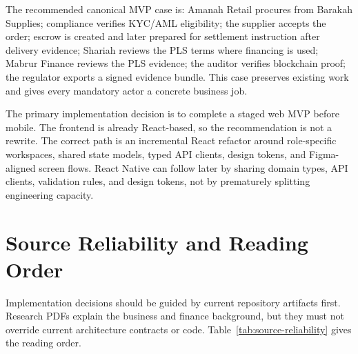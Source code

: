 \documentclass[conference]{IEEEtran}
\begin{document}
The recommended canonical MVP case is: Amanah Retail procures from Barakah Supplies; compliance verifies KYC/AML eligibility; the supplier accepts the order; escrow is created and later prepared for settlement instruction after delivery evidence; Shariah reviews the PLS terms where financing is used; Mabrur Finance reviews the PLS evidence; the auditor verifies blockchain proof; the regulator exports a signed evidence bundle. This case preserves existing work and gives every mandatory actor a concrete business job.

The primary implementation decision is to complete a staged web MVP before mobile. The frontend is already React-based, so the recommendation is not a rewrite. The correct path is an incremental React refactor around role-specific workspaces, shared state models, typed API clients, design tokens, and Figma-aligned screen flows. React Native can follow later by sharing domain types, API clients, validation rules, and design tokens, not by prematurely splitting engineering capacity.

\section{Source Reliability and Reading Order}
Implementation decisions should be guided by current repository artifacts first. Research PDFs explain the business and finance background, but they must not override current architecture contracts or code. Table~\ref{tab:source-reliability} gives the reading order.
\end{document}
